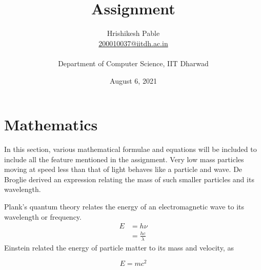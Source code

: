 \documentclass[10pt]{article}
\begin{document}






\title{Assignment} 
\author{Hrishikesh Pable \\ \href{mailto:200010037@iitdh.ac.in}{200010037@iitdh.ac.in} \\ \\
Department of Computer Science, IIT Dharwad}

\date{August 6, 2021}
\maketitle


\newpage

\tableofcontents
\listoffigures
\listoftables


\newpage
\section{Mathematics}
\label{section:sec1}
\medskip

In this section, various mathematical formulae and equations will be included to include all the feature mentioned in the assignment. Very low mass particles moving at speed less than that of light behaves like a particle and wave. De Broglie derived an expression relating the mass of such smaller particles and its wavelength.

Plank's quantum theory relates the energy of an electromagnetic wave to its wavelength or frequency.\\


\begin{align}
 E & =h\nu \nonumber \\ 
   & =\frac{hc}{\lambda} 
\end{align}
Einstein related the energy of particle matter to its mass and velocity, as

\begin{equation}
E=mc^2
\end{equation}
\end{document}
